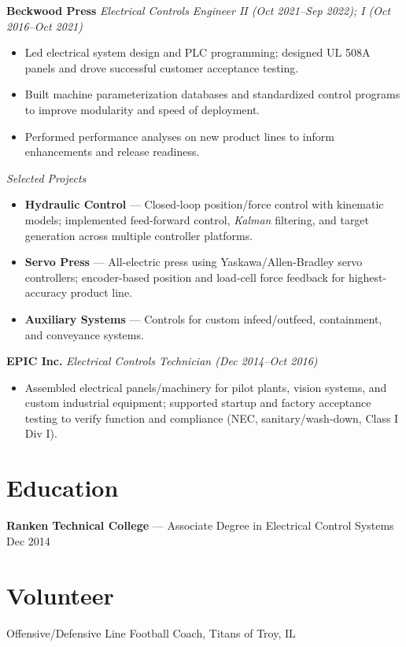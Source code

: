 \documentclass[letterpaper,10pt]{article}
\begin{document}
\textbf{Beckwood Press} \hfill \textit{Electrical Controls Engineer II (Oct 2021–Sep 2022); I (Oct 2016–Oct 2021)}\\[-0.25em]
\begin{itemize}
    \item Led electrical system design and PLC programming; designed UL 508A panels and drove successful customer acceptance testing.
    \item Built machine parameterization databases and standardized control programs to improve modularity and speed of deployment.
    \item Performed performance analyses on new product lines to inform enhancements and release readiness.
\end{itemize}
\textit{Selected Projects}
\begin{itemize}
    \item \textbf{Hydraulic Control} — Closed-loop position/force control with kinematic models; implemented feed-forward control, \textit{Kalman} filtering, and target generation across multiple controller platforms.
    \item \textbf{Servo Press} — All-electric press using Yaskawa/Allen-Bradley servo controllers; encoder-based position and load-cell force feedback for highest-accuracy product line.
    \item \textbf{Auxiliary Systems} — Controls for custom infeed/outfeed, containment, and conveyance systems.
\end{itemize}

\textbf{EPIC Inc.} \hfill \textit{Electrical Controls Technician (Dec 2014–Oct 2016)}\\[-0.25em]
\begin{itemize}
    \item Assembled electrical panels/machinery for pilot plants, vision systems, and custom industrial equipment; supported startup and factory acceptance testing to verify function and compliance (NEC, sanitary/wash-down, Class I Div I).
\end{itemize}

\section{Education}
\textbf{Ranken Technical College} — Associate Degree in Electrical Control Systems \hfill Dec 2014

\section{Volunteer}
Offensive/Defensive Line Football Coach, Titans of Troy, IL
\end{document}
